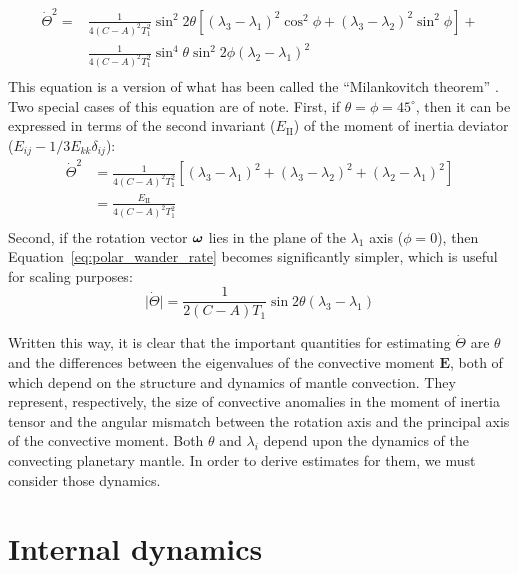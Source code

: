 \documentclass[extra,mreferee]{gji}
\begin{document}
\begin{equation}
\begin{aligned}
\dot{\Theta}^2 = 
&\frac{1}{4(C-A)^2 T_1^2}\sin^2{2\theta} \left[( \lambda_3 - \lambda_1)^2 \cos^2{\phi} + (\lambda_3 - \lambda_2)^2 \sin^2{\phi} \right] +\\
&\frac{1}{4(C-A)^2 T_1^2}\sin^4{\theta} \sin^2{2\phi}\left( \lambda_2 - \lambda_1 \right)^2 \\
\label{eq:polar_wander_rate}
\end{aligned}
\end{equation}
This equation is a version of what has been called the ``Milankovitch theorem'' \citep{munk1960rotation}.
Two special cases of this equation are of note. First, if $\theta=\phi=45^\circ$, then it can be expressed in terms of
the second invariant ($E_{\mathrm{II}}$) of the moment of inertia deviator ($E_{ij} - 1/3 E_{kk} \delta_{ij}$):
\begin{equation}
\begin{aligned}
\dot{\Theta}^2
&= \frac{1}{4(C-A)^2 T_1^2}\left[( \lambda_3 - \lambda_1)^2 + (\lambda_3 - \lambda_2)^2 + (\lambda_2 - \lambda_1)^2 \right]\\
&= \frac{E_{\mathrm{II}}}{4(C-A)^2 T_1^2} \\
\end{aligned}
\end{equation}
Second, if the rotation vector $\mitbf{\omega}$ lies in the plane of the $\lambda_1$ axis ($\phi = 0$), then 
Equation~\eqref{eq:polar_wander_rate} becomes significantly simpler, which is useful for scaling purposes:
\begin{equation}
\vert \dot{\Theta} \vert = 
\frac{1}{2(C-A) T_1}\sin{2\theta} ( \lambda_3 - \lambda_1) 
\label{eq:simple_milankovitch}
\end{equation}

Written this way, it is clear that the important quantities for estimating $\dot{\Theta}$ are $\theta$ and the differences between the eigenvalues of the convective moment $\mathbf{E}$, both of which depend on the structure and dynamics of mantle convection.  
They represent, respectively, the size of convective anomalies in the moment of inertia tensor and the angular mismatch between the rotation axis and the principal axis of the convective moment.
Both $\theta$ and $\lambda_i$ depend upon the dynamics of the convecting planetary mantle.
In order to derive estimates for them, we must consider those dynamics.

\section{Internal dynamics}
\label{sec:internal}
\end{document}
